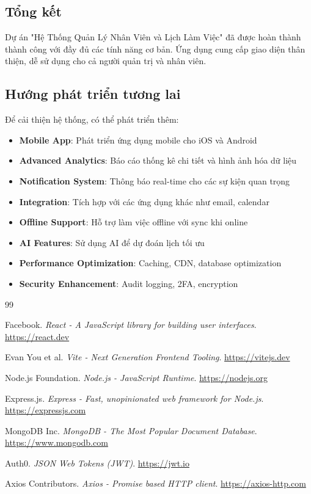 \documentclass[12pt,a4paper]{report}
\begin{document}
\subsection{Tổng kết}

Dự án "Hệ Thống Quản Lý Nhân Viên và Lịch Làm Việc" đã được hoàn thành thành công với đầy đủ các tính năng cơ bản. Ứng dụng cung cấp giao diện thân thiện, dễ sử dụng cho cả người quản trị và nhân viên.

\subsection{Hướng phát triển tương lai}

Để cải thiện hệ thống, có thể phát triển thêm:

\begin{itemize}
    \item \textbf{Mobile App}: Phát triển ứng dụng mobile cho iOS và Android
    \item \textbf{Advanced Analytics}: Báo cáo thống kê chi tiết và hình ảnh hóa dữ liệu
    \item \textbf{Notification System}: Thông báo real-time cho các sự kiện quan trọng
    \item \textbf{Integration}: Tích hợp với các ứng dụng khác như email, calendar
    \item \textbf{Offline Support}: Hỗ trợ làm việc offline với sync khi online
    \item \textbf{AI Features}: Sử dụng AI để dự đoán lịch tối ưu
    \item \textbf{Performance Optimization}: Caching, CDN, database optimization
    \item \textbf{Security Enhancement}: Audit logging, 2FA, encryption
\end{itemize}

\newpage

\begin{thebibliography}{99}

 Facebook. \textit{React - A JavaScript library for building user interfaces}. 
\url{https://react.dev}

 Evan You et al. \textit{Vite - Next Generation Frontend Tooling}. 
\url{https://vitejs.dev}

 Node.js Foundation. \textit{Node.js - JavaScript Runtime}. 
\url{https://nodejs.org}

 Express.js. \textit{Express - Fast, unopinionated web framework for Node.js}. 
\url{https://expressjs.com}

 MongoDB Inc. \textit{MongoDB - The Most Popular Document Database}. 
\url{https://www.mongodb.com}

 Auth0. \textit{JSON Web Tokens (JWT)}. 
\url{https://jwt.io}

 Axios Contributors. \textit{Axios - Promise based HTTP client}. 
\url{https://axios-http.com}

\end{thebibliography}
\end{document}
